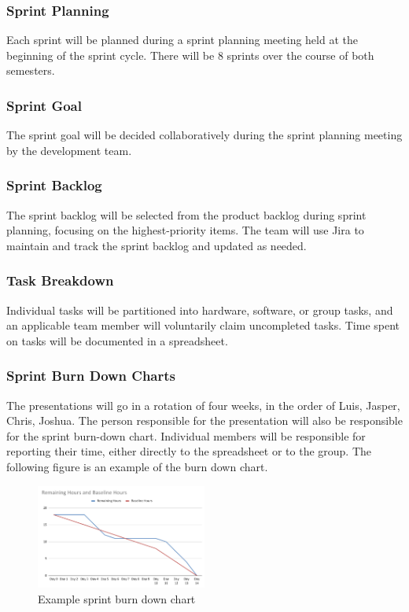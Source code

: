 \subsubsection{Sprint Planning}
Each sprint will be planned during a sprint planning meeting held at the beginning of the sprint cycle. There will be 8 sprints over the course of both semesters.
\subsubsection{Sprint Goal} 
The sprint goal will be decided collaboratively during the sprint planning meeting by the development team.
\subsubsection{Sprint Backlog}
The sprint backlog will be selected from the product backlog during sprint planning, focusing on the highest-priority items. The team will use Jira to maintain and track the sprint backlog and updated as needed.

\subsubsection{Task Breakdown}
Individual tasks will be partitioned into hardware, software, or group tasks, and an applicable team member will voluntarily claim uncompleted tasks. Time spent on tasks will be documented in a spreadsheet.

\subsubsection{Sprint Burn Down Charts}
The presentations will go in a rotation of four weeks, in the order of Luis, Jasper, Chris, Joshua. The person responsible for the presentation will also be responsible for the sprint burn-down chart. Individual members will be responsible for reporting their time, either directly to the spreadsheet or to the group. The following figure is an example of the burn down chart.

\begin{figure}[h!]
    \centering
    \includegraphics[width=0.5\textwidth]{images/burndown}
    \caption{Example sprint burn down chart}
\end{figure}

